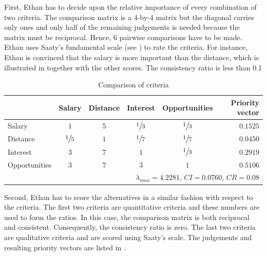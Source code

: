 First, Ethan has to decide upon the relative importance of every combination of two criteria. The comparison matrix is a 4-by-4 matrix but the diagonal carries only ones and only half of the remaining judgements is needed because the matrix must be reciprocal. Hence, 6 pairwise comparisons have to be made. Ethan uses Saaty's fundamental scale (see ) to rate the criteria. For instance, Ethan is convinced that the salary is more important than the distance, which is illustrated in  together with the other scores. The consistency ratio is less than 0.1

\begin{table}[h]
    \begin{center}
        \begin{tabular}{lccccr}
            \hline
                          & Salary          & Distance & Interest        & Opportunities   & Priority vector \\
            \hline
            Salary        & $1$             & $5$      & ${\large \sfrac{1}{3}}$ & ${\large \sfrac{1}{3}}$ & $0.1525$        \\
            Distance      & ${\large \sfrac{1}{5}}$ & $1$      & ${\large \sfrac{1}{7}}$ & ${\large \sfrac{1}{7}}$ & $0.0450$        \\
            Interest      & $3$             & $7$      & $1$             & ${\large \sfrac{1}{3}}$ & $0.2919$        \\        
            Opportunities & $3$             & $7$      & $3$             & $1$             & $0.5106$        \\    
            \hline
            \multicolumn{6}{r}{$\lambda_{max} = 4.2281$, $CI = 0.0760$, $CR=0.08$}                           \\
            \hline
        \end{tabular}
        \caption{Comparison of criteria}
        \label{tab:ahp-criteria}
    \end{center}
\end{table}

Second, Ethan has to score the alternatives in a similar fashion with respect to the criteria. The first two criteria are quantitative criteria and these numbers are used to form the ratios. In this case, the comparison matrix is both reciprocal and consistent. Consequently, the consistency ratio is zero. The last two criteria are qualitative criteria and are scored using Saaty's scale. The judgements and resulting priority vectors are listed in .


